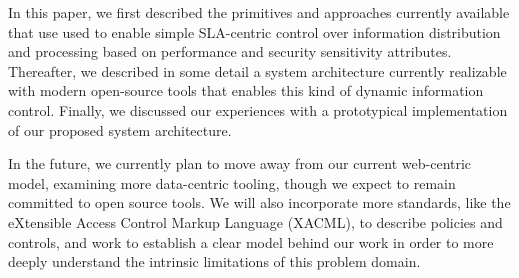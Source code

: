 \documentclass{sig-alternate}
\begin{document}
In this paper, we first described the primitives and approaches currently available that use used to enable simple SLA-centric control over information distribution and processing based on performance and security sensitivity attributes.  Thereafter, we described in some detail a system architecture currently realizable with modern open-source tools that enables this kind of dynamic information control.  Finally, we discussed our experiences with a prototypical implementation of our proposed system architecture.

In the future, we currently plan to move away from our current web-centric model, examining more data-centric tooling, though we expect to remain committed to open source tools.  We will also incorporate more standards, like the eXtensible Access Control Markup Language (XACML), to describe policies and controls, and work to establish a clear model behind our work in order to more deeply understand the intrinsic limitations of this problem domain.



\end{document}
